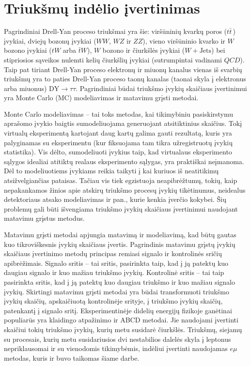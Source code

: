 \documentclass[a4paper, 12pt]{article}
\newcommand{\emu}{e\mu}
\newcommand{\WJets}{W\! +\!\mathrm{Jets}}
\newcommand{\DYtau}{\mathrm{DY} \! \rightarrow \! \tau\tau}
\newcommand{\QCD}{QC\! D}
\begin{document}
\section{Triukšmų indėlio įvertinimas}\label{sec:SignalBkg}
	 
Pagrindiniai Drell-Yan proceso triukšmai yra šie: viršūninių kvarkų poros ($t\bar{t}\,$) įvykiai, dviejų bozonų
įvykiai ($WW$, $WZ$ ir $ZZ$), vieno viršūninio kvarko ir $W$ bozono įvykiai ($tW$ arba $\bar{t}W$), $W$ bozono
ir čiurkšlės įvykiai ($\WJets$) bei stipriosios sąveikos nulemti kelių čiurkšlių įvykiai (sutrumpintai vadinami $\QCD$).
Taip pat tiriant Drell-Yan proceso elektronų ir miuonų kanalus vienas iš svarbių triukšmų yra
to paties Drell-Yan proceso taonų kanalas (taonai skyla į elektronus arba miuonus) $\DYtau$.
Pagrindiniai būdai triukšmo įvykių skaičiaus įvertinimui yra Monte Carlo (MC) modeliavimas ir
matavimu grįsti metodai.

Monte Carlo modeliavimas -- tai toks metodas, kai tikimybiniu pasiskirstymu aprašomo
įvykio baigtis sumodeliuojama generuojant atsitiktinius skaičius.
Tokį virtualų eksperimentą kartojant daug kartų galima gauti rezultatą, kuris yra palyginamas
su eksperimentu (kur fiksuojama tam tikra užregistruotų įvykių statistika).
Vis dėlto, sumodeliuoti įvykius taip, kad virtualaus eksperimento sąlygos idealiai atitiktų
realaus eksperimento sąlygas, yra praktiškai neįmanoma.
Dėl to modeliuotiems įvykiams reikia taikyti į kai kuriuos iš neatitikimų atsižvelgiančias pataisas.
Tačiau vis tiek egzistuoja neapibrėžtumų, tokių, kaip nepakankamos žinios apie atskirų triukšmo
procesų įvykių tikėtinumus, neidealus detektoriaus atsako modeliavimas ir pan., kurie kenkia
įverčio kokybei.
Šių problemų gali būti išvengiama triukšmo įvykių skaičiaus įvertinimui naudojant matavimu
grįstus metodus.

Matavimu grįsti metodai apjungia matavimą ir modeliavimą, kad būtų gautas kuo
tikroviškesnis įvykių skaičiaus įvertis.
Pagrindinis matavimu grįstų įvykių skaičiaus įvertinimo metodų principas remiasi signalo ir
kontrolinės sričių apibrėžimais.
Signalo sritis -- tai sritis, pasirinkta taip, kad į ją patektų
kuo daugiau signalo ir kuo mažiau triukšmo įvykių.
Kontrolinė sritis -- tai taip pasirinkta sritis, kad į ją patektų kuo daugiau triukšmo ir kuo
mažiau signalo įvykių.
Skirtingi matavimu grįsti metodai yra būdai transformuoti triukšmo įvykių skaičių, apskaičiuotą
kontrolinėje srityje, į triukšmo įvykių skaičių, patenkantį į signalo sritį.
Eksperimentinėje didelių energijų fizikoje ganėtinai populiarūs yra klaidingo atpažinimo ir ABCD metodai.
Jie naudojami įvertinti skaičiui tokių triukšmo įvykių, kurių metu susidarė čiurkšlės.
Triukšmų, siejamų su procesais, kurių metu susidariusios dvi nestabilios dalelės skyla
į leptonus nepriklausomai ir su vienodomis tikimybėmis, indėliui įvertinti naudojamas $\emu$ metodas,
kuris ir buvo taikomas šiame darbe.
\end{document}
